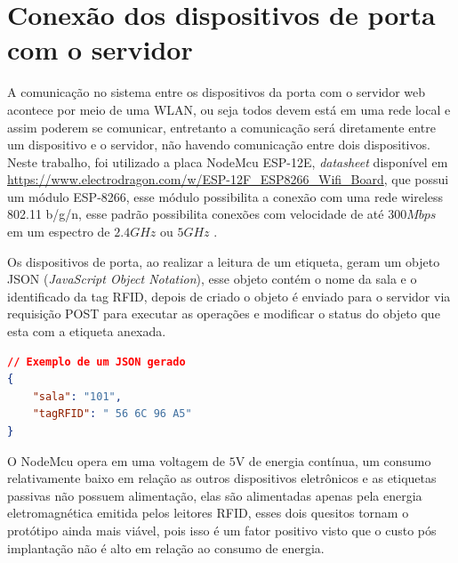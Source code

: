 \section{Conexão dos dispositivos de porta com o servidor}

A comunicação no sistema entre os dispositivos da porta com o servidor web acontece por meio de uma WLAN, ou seja todos devem está em uma rede local e assim poderem se comunicar, entretanto a comunicação será diretamente entre um dispositivo e o servidor,
não havendo comunicação entre dois dispositivos. Neste trabalho, foi utilizado a placa NodeMcu ESP-12E, \textit{datasheet} disponível em \url{https://www.electrodragon.com/w/ESP-12F_ESP8266_Wifi_Board},  que possui um módulo ESP-8266, esse módulo possibilita a conexão com uma rede wireless 802.11 b/g/n, esse padrão possibilita conexões com velocidade de até $300Mbps$ em um espectro de $2.4GHz$ ou $5GHz$ .

\par
Os dispositivos de porta, ao realizar a leitura de um etiqueta, geram um objeto JSON (\textit{JavaScript Object Notation}), esse objeto contém o nome da sala e o identificado da tag RFID, depois de criado o objeto é enviado para o servidor via requisição POST para executar as operações e modificar o status do objeto que esta com a etiqueta anexada.

\begin{lstlisting}[language=json,firstnumber=1]
// Exemplo de um JSON gerado
{
    "sala": "101",
    "tagRFID": " 56 6C 96 A5"
}  
\end{lstlisting}

\par
O NodeMcu opera em uma voltagem de $5$V de energia contínua, um consumo relativamente baixo em relação as outros dispositivos eletrônicos e as etiquetas passivas não possuem alimentação, elas são alimentadas apenas pela energia eletromagnética emitida pelos leitores RFID, esses dois quesitos tornam o protótipo ainda mais viável, pois isso é um fator positivo visto que o custo pós implantação não é alto em relação ao consumo de energia.



